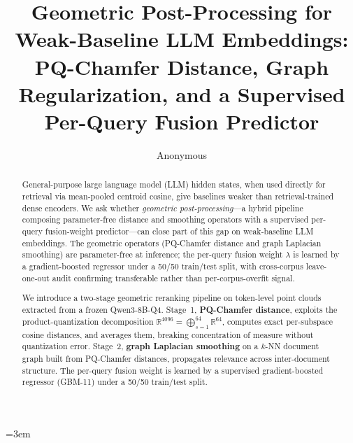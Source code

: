 \documentclass[review,1p]{elsarticle}
\begin{document}
\sloppy
\emergencystretch=3em


\begin{frontmatter}

\title{Geometric Post-Processing for Weak-Baseline LLM Embeddings: PQ-Chamfer Distance, Graph Regularization, and a Supervised Per-Query Fusion Predictor}

\author{Anonymous}
\address{Anonymous Institution}

\begin{abstract}
General-purpose large language model (LLM) hidden states, when used directly for retrieval via mean-pooled centroid cosine, give baselines weaker than retrieval-trained dense encoders. We ask whether \emph{geometric post-processing}---a hybrid pipeline composing parameter-free distance and smoothing operators with a supervised per-query fusion-weight predictor---can close part of this gap on weak-baseline LLM embeddings. The geometric operators (PQ-Chamfer distance and graph Laplacian smoothing) are parameter-free at inference; the per-query fusion weight $\lambda$ is learned by a gradient-boosted regressor under a 50/50 train/test split, with cross-corpus leave-one-out audit confirming transferable rather than per-corpus-overfit signal.

We introduce a two-stage geometric reranking pipeline on token-level point clouds extracted from a frozen Qwen3-8B-Q4. Stage~1, \textbf{PQ-Chamfer distance}, exploits the product-quantization decomposition $\mathbb{R}^{4096} = \bigoplus_{s=1}^{64} \mathbb{R}^{64}$, computes exact per-subspace cosine distances, and averages them, breaking concentration of measure without quantization error. Stage~2, \textbf{graph Laplacian smoothing} on a $k$-NN document graph built from PQ-Chamfer distances, propagates relevance across inter-document structure. The per-query fusion weight is learned by a supervised gradient-boosted regressor (GBM-11) under a 50/50 train/test split.


\end{abstract}
\end{frontmatter}
\end{document}
